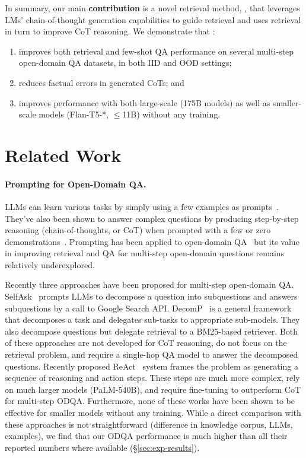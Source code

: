 In summary, our main \textbf{contribution} is a novel retrieval method, \iconsys, that leverages LMs' chain-of-thought generation capabilities to guide retrieval and uses retrieval in turn to improve CoT reasoning. We demonstrate that \iconsys:
\begin{enumerate}[nosep]

    \item improves both retrieval and few-shot QA performance on several multi-step open-domain QA datasets, in both IID and OOD settings;

    \item reduces factual errors in generated CoTs; and

    \item improves performance with both large-scale (175B models) as well as smaller-scale models (Flan-T5-*, $\le$11B) without any training.

\end{enumerate}
\section{Related Work}
\label{sec:related_work}

\paragraph{Prompting for Open-Domain QA.}

LLMs can learn various tasks by simply using a few examples as prompts~\cite{originalgpt3}. They've also been shown to answer complex questions by producing step-by-step reasoning (chain-of-thoughts, or CoT) when prompted with a few or zero demonstrations~\cite{cot, zerocot}. Prompting has been applied to open-domain QA~\cite{internet-augmented-qa,recitationlm,Yu2022GenerateRT} but its value in improving retrieval and QA for multi-step open-domain questions remains relatively underexplored.

Recently three approaches have been proposed for multi-step open-domain QA. SelfAsk~\cite{selfask} prompts LLMs to decompose a question into subquestions and answers subquestions by a call to Google Search API. DecomP~\cite{decomp} is a general framework that decomposes a task and delegates sub-tasks to appropriate sub-models. They also decompose questions but delegate retrieval to a BM25-based retriever. Both of these approaches are not developed for CoT reasoning, do not focus on the retrieval problem, and require a single-hop QA model to answer the decomposed questions. Recently proposed ReAct~\cite{react} system frames the problem as generating a sequence of reasoning and action steps. These steps are much more complex, rely on much larger models (PaLM-540B), and require fine-tuning to outperform CoT for multi-step ODQA. Furthermore, none of these works have been shown to be effective for smaller models without any training. While a direct comparison with these approaches is not straightforward (difference in knowledge corpus, LLMs, examples), we find that our ODQA performance is much higher than all their reported numbers where available (\S\ref{sec:exp-results}).


